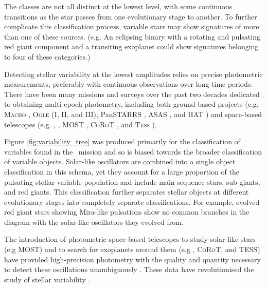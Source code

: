 The classes are not all distinct at the lowest level, with some continuous transitions as the star passes from one evolutionary stage to another. To further complicate this classification process, variable stars may show signatures of more than one of these sources. (e.g. An eclipsing binary with a rotating and pulsating red giant component and a transiting exoplanet could show signatures belonging to four of these categories.) 

Detecting stellar variability at the lowest amplitudes relies on precise photometric measurements, preferably with continuous observations over long time periods.
There have been many missions and surveys over the past two decades dedicated to obtaining multi-epoch photometry, including both ground-based projects (e.g. \textsc{Macho} \citep{alcock_search_1992}, \textsc{Ogle} \citep{udalski_optical_1992} (I, II, and III), PanSTARRS \citep{kaiser_pan-starrs_2002}, ASAS \citep{pojmanski_all_2000}, and HAT \citep{bakos_system_2002}) and space-based telescopes (e.g. \Kepler \citep{borucki_kepler_2009}, \Gaia \citep{jordi_gaia_2010}, MOST \citep{walker_most_2003}, \textsc{CoRoT} \citep{michel_corot_1998}, and \textsc{Tess} \citep{ricker_transiting_2014}).

Figure \ref{fig:variability_tree} was produced primarily for the classification of variables found in the \Gaia~mission and so is biased towards the broader classification of variable objects. Solar-like oscillators are combined into a single object classification in this schema, yet they account for a large proportion of the pulsating stellar variable population and include main-sequence stars, sub-giants, and red giants. This classification further separates stellar objects at different evolutionary stages into completely separate classifications. For example, evolved red giant stars showing Mira-like pulsations show no common branches in the diagram with the solar-like oscillators they evolved from.

The introduction of photometric space-based telescopes to study solar-like stars (e.g MOST) and to search for exoplanets around them (e.g \Kepler, \textsc{CoRoT}, and TESS) have provided high-precision photometry with the quality and quantity necessary to detect these oscillations unambiguously \cite[][and references therein]{chaplin_asteroseismology_2013}. These data have revolutionised the study of stellar variability \cite[e.g.][]{aerts_asteroseismology_2010, di_mauro_review_2017, garcia_asteroseismology_2019}. 


